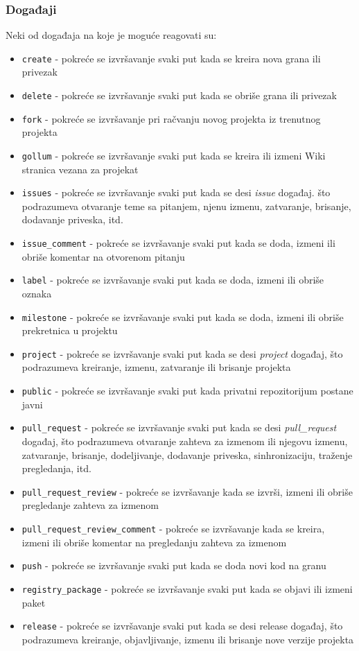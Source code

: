 \documentclass[12pt]{report}
\begin{document}
\subsubsection{Događaji}
Neki od događaja na koje je moguće reagovati su:

\begin{itemize}
    \item \texttt{create} - pokreće se izvršavanje svaki put kada se kreira nova grana ili privezak
    \item \texttt{delete} - pokreće se izvršavanje svaki put kada se obriše grana ili privezak
    \item \texttt{fork} - pokreće se izvršavanje pri račvanju novog projekta iz trenutnog projekta
    \item \texttt{gollum} - pokreće se izvršavanje svaki put kada se kreira ili izmeni Wiki stranica vezana za projekat
    \item \texttt{issues} - pokreće se izvršavanje svaki put kada se desi \textit{issue} događaj. što podrazumeva otvaranje teme sa pitanjem, njenu izmenu, zatvaranje, brisanje, dodavanje priveska, itd.
    \item \texttt{issue\_comment} - pokreće se izvršavanje svaki put kada se doda, izmeni ili obriše komentar na otvorenom pitanju
    \item \texttt{label} - pokreće se izvršavanje svaki put kada se doda, izmeni ili obriše oznaka
    \item \texttt{milestone} - pokreće se izvršavanje svaki put kada se doda, izmeni ili obriše prekretnica u projektu
    \item \texttt{project} - pokreće se izvršavanje svaki put kada se desi \textit{project} događaj, što podrazumeva kreiranje, izmenu, zatvaranje ili brisanje projekta
    \item \texttt{public} - pokreće se izvršavanje svaki put kada privatni repozitorijum postane javni
    \item \texttt{pull\_request} - pokreće se izvršavanje svaki put kada se desi \textit{pull\_request} događaj, što podrazumeva otvaranje zahteva za izmenom ili njegovu izmenu, zatvaranje, brisanje, dodeljivanje, dodavanje priveska, sinhronizaciju, traženje pregledanja, itd.
    \item \texttt{pull\_request\_review} - pokreće se izvršavanje kada se izvrši, izmeni ili obriše pregledanje zahteva za izmenom
    \item \texttt{pull\_request\_review\_comment} - pokreće se izvršavanje kada se kreira, izmeni ili obriše komentar na pregledanju zahteva za izmenom
    \item \texttt{push} - pokreće se izvršavanje svaki put kada se doda novi kod na granu
    \item \texttt{registry\_package} - pokreće se izvršavanje svaki put kada se objavi ili izmeni paket
    \item \texttt{release} - pokreće se izvršavanje svaki put kada se desi release događaj, što podrazumeva kreiranje, objavljivanje, izmenu ili brisanje nove verzije projekta
\end{itemize}
\end{document}

